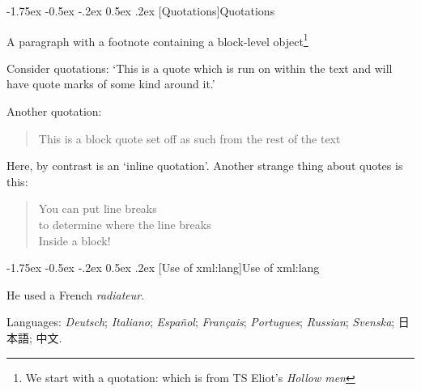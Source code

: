 \documentclass[11pt,twoside]{article}\makeatletter
\makeatletter
\def\textJapanese{\fontspec{Noto Sans CJK JP}}
\def\textChinese{\fontspec{Noto Sans CJK SC}}
\def\textJapanese{}
\def\textChinese{}
\renewcommand\section{\@startsection {section}{1}{\z@}%
     {-1.75ex \@plus -0.5ex \@minus -.2ex}%
     {0.5ex \@plus .2ex}%
     {\reset@font\Large\bfseries\sffamily}}
\makeatother
\begin{document}
\section[{Quotations}]{Quotations}\par
A paragraph with a footnote containing a block-level object\footnote{We start with a quotation:
 which is from TS Eliot's \textit{Hollow men}}\par
Consider quotations: ‘This is a quote which is run on within the text and will have quote marks of some kind around it.’\par
Another quotation: \begin{quote}This is a block quote set off as such from the rest of the text\end{quote}\par
Here, by contrast is an ‘inline quotation’. Another strange thing about quotes is this: \begin{quote}You can put line breaks{\hskip1pt}\\{}to determine where the line breaks{\hskip1pt}\\{}Inside a block!\end{quote}
\section[{Use of xml:lang}]{Use of xml:lang}\par
He used a French \textit{radiateur}.\par
Languages: \textit{Deutsch}; \textit{Italiano}; \textit{Español}; \textit{Français}; \textit{Portugues}; \textit{Russian}; \textit{Svenska}; {\textJapanese 日本語}; {\textChinese 中文}.
\end{document}
